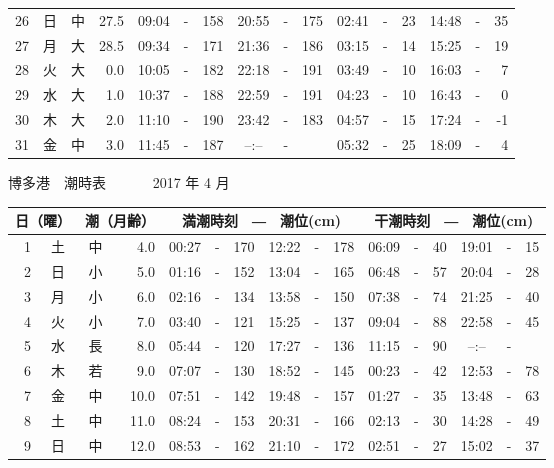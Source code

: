 \documentclass[12pt.a4j]{jsarticle}
\begin{document}
\begin{center}
\begin{table}[ht]
\begin{tabular}{|rc|cr|ccrccr|ccrccr|}
26 & 日 & 中 & 27.5 &  09:04 &-& 158  &  20:55 &-& 175  &   02:41 &-&  23  &   14:48 &-&  35  \\
27 & 月 & 大 & 28.5 &  09:34 &-& 171  &  21:36 &-& 186  &   03:15 &-&  14  &   15:25 &-&  19  \\
28 & 火 & 大 &  0.0 &  10:05 &-& 182  &  22:18 &-& 191  &   03:49 &-&  10  &   16:03 &-&   7  \\
29 & 水 & 大 &  1.0 &  10:37 &-& 188  &  22:59 &-& 191  &   04:23 &-&  10  &   16:43 &-&   0  \\
30 & 木 & 大 &  2.0 &  11:10 &-& 190  &  23:42 &-& 183  &   04:57 &-&  15  &   17:24 &-&  -1  \\
31 & 金 & 中 &  3.0 &  11:45 &-& 187  &  --:-- &-&     &   05:32 &-&  25  &   18:09 &-&   4  \\
   \hline
   \end{tabular}
\end{table}
\newpage
 {\LARGE 博多港　潮時表　　　}
 {\large 2017 年  4 月}\\
 \begin{table}[ht]
    \begin{tabular}{|rc|cr|ccrccr|ccrccr|}
    \hline
    \multicolumn{2}{|c|}{日（曜）} & \multicolumn{2}{c|}{潮（月齢）} & \multicolumn{6}{c|}{満潮時刻　―　潮位(cm)} & \multicolumn{6}{c|}{干潮時刻　―　潮位(cm)} \\
 \hline
 1 & 土 & 中 &  4.0 &  00:27 &-& 170  &  12:22 &-& 178  &   06:09 &-&  40  &   19:01 &-&  15  \\
 2 & 日 & 小 &  5.0 &  01:16 &-& 152  &  13:04 &-& 165  &   06:48 &-&  57  &   20:04 &-&  28  \\
 3 & 月 & 小 &  6.0 &  02:16 &-& 134  &  13:58 &-& 150  &   07:38 &-&  74  &   21:25 &-&  40  \\
 4 & 火 & 小 &  7.0 &  03:40 &-& 121  &  15:25 &-& 137  &   09:04 &-&  88  &   22:58 &-&  45  \\
 5 & 水 & 長 &  8.0 &  05:44 &-& 120  &  17:27 &-& 136  &   11:15 &-&  90  &   --:-- &-&     \\
 6 & 木 & 若 &  9.0 &  07:07 &-& 130  &  18:52 &-& 145  &   00:23 &-&  42  &   12:53 &-&  78  \\
 7 & 金 & 中 & 10.0 &  07:51 &-& 142  &  19:48 &-& 157  &   01:27 &-&  35  &   13:48 &-&  63  \\
 8 & 土 & 中 & 11.0 &  08:24 &-& 153  &  20:31 &-& 166  &   02:13 &-&  30  &   14:28 &-&  49  \\
 9 & 日 & 中 & 12.0 &  08:53 &-& 162  &  21:10 &-& 172  &   02:51 &-&  27  &   15:02 &-&  37  \\

\end{tabular}
\end{table}
\end{center}
\end{document}
